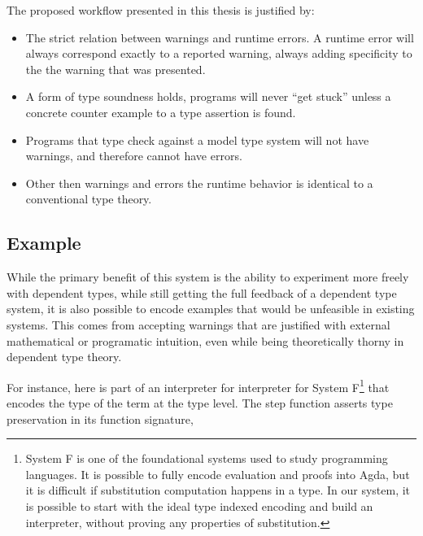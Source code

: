 The proposed workflow presented in this thesis is justified by: 
\begin{itemize}
\item The strict relation between warnings and runtime errors. A runtime
error will always correspond exactly to a reported warning, always
adding specificity to the the warning that was presented.
\item A form of type soundness holds, programs will never ``get stuck''
unless a concrete counter example to a type assertion is found.
\item Programs that type check against a model type system will not have
warnings, and therefore cannot have errors.
\item Other then warnings and errors the runtime behavior is identical to
a conventional type theory.
\end{itemize}

\subsection{Example}

While the primary benefit of this system is the ability to experiment
more freely with dependent types, while still getting the full feedback
of a dependent type system, it is also possible to encode examples
that would be unfeasible in existing systems. This comes from accepting
warnings that are justified with external mathematical or programatic
intuition, even while being theoretically thorny in dependent type
theory.

For instance, here is part of an interpreter for interpreter for System
F\footnote{System F is one of the foundational systems used to study programming
languages. It is possible to fully encode evaluation and proofs into
Agda, but it is difficult if substitution computation happens in a
type. In our system, it is possible to start with the ideal type indexed
encoding and build an interpreter, without proving any properties
of substitution.} that encodes the type of the term at the type level. The step function
asserts type preservation in its function signature,

